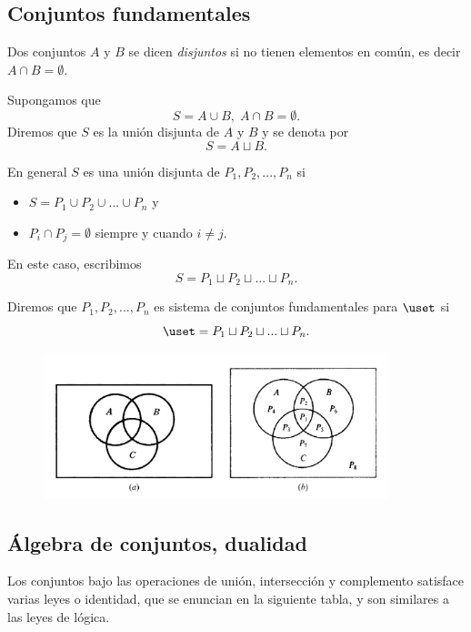 \subsection{Conjuntos fundamentales}


Dos conjuntos $A$ y $B$ se dicen \emph{disjuntos} si no tienen elementos en común, es decir $A\cap B=\emptyset$.


Supongamos que 
$$
S=A\cup B, \; A\cap B=\emptyset.
$$  Diremos que $S$ es la unión disjunta de $A$ y $B$ y se denota por $$S=A \sqcup B.$$ 




En general $S$ es una unión disjunta de $P_{1}, P_{2},...,P_{n}$ si 
\begin{itemize}
	\item $\displaystyle S=P_{1}\cup P_{2}\cup...\cup P_{n}$ y
	\item $P_{i}\cap P_{j}=\emptyset$ siempre y cuando $i\neq j.$
\end{itemize}


En este caso, escribimos
$$
S=P_{1}\sqcup P_{2}\sqcup...\sqcup P_{n}.
$$



Diremos que $P_{1}, P_{2},...,P_{n}$ es sistema de conjuntos fundamentales para $\uset$ si
$$
\uset = P_{1}\sqcup P_{2}\sqcup...\sqcup P_{n}.
$$






\begin{figure}
	\centering
	\includegraphics[width=10cm,keepaspectratio=true]{./md/sistema_fundamental.png}
	\label{fig:0105}
\end{figure}




\subsection{Álgebra de conjuntos, dualidad}


Los conjuntos bajo las operaciones de unión, intersección y complemento satisface varias leyes o identidad, que se enuncian en la siguiente tabla, y son similares a las leyes de lógica.



